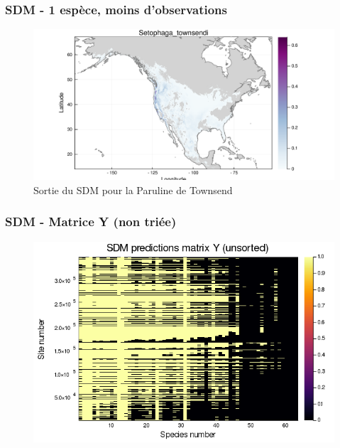 \documentclass[10pt]{beamer}
\begin{document}
\begin{frame}
  \frametitle{SDM - 1 espèce, moins d'observations}
  \begin{figure}
    \centering
    \includegraphics[scale=0.4]{fig/sdm-sp-Setophaga_townsendi.pdf}
    \caption{Sortie du SDM pour la Paruline de Townsend}
  \end{figure}
\end{frame}

\begin{frame}
  \frametitle{SDM - Matrice Y (non triée)}
  \begin{figure}
    \centering
    \includegraphics[scale=0.4]{fig/sdm-Y-unsorted.png}
  \end{figure}
\end{frame}
\end{document}
